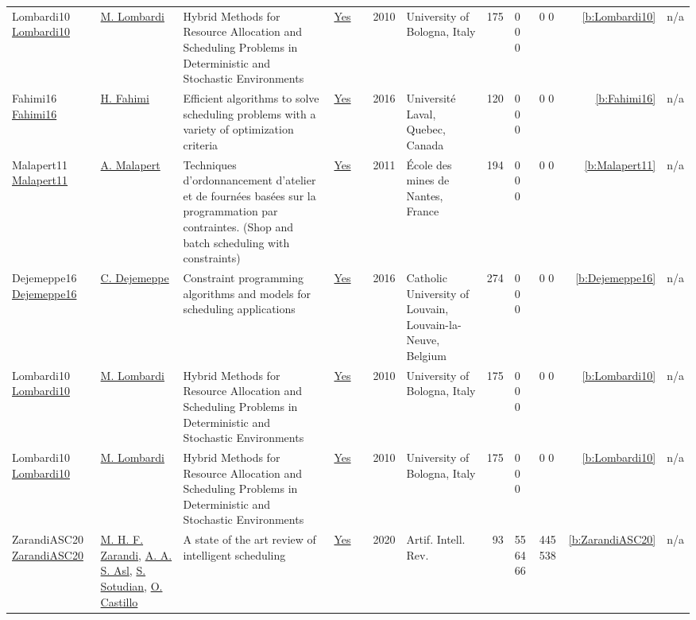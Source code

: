 {\begin{longtable}{>{\raggedright\arraybackslash}p{3cm}>{\raggedright\arraybackslash}p{4.5cm}>{\raggedright\arraybackslash}p{6.0cm}rrrp{2.5cm}rp{1cm}p{1cm}rr}
Lombardi10 \href{http://amsdottorato.unibo.it/2961/}{Lombardi10} & \hyperref[auth:a142]{M. Lombardi} & Hybrid Methods for Resource Allocation and Scheduling Problems in Deterministic and Stochastic Environments & \href{../works/Lombardi10.pdf}{Yes} & \cite{Lombardi10} & 2010 & University of Bologna, Italy & 175 & 0 0 0 & 0 0 & \ref{b:Lombardi10} & n/a\\
Fahimi16 \href{http://cp2014.a4cp.org/sites/default/files/hamed_fahimi_-_efficient_algorithms_to_solve_scheduling_problems_with_a_variety_of_optimization_criteria.pdf}{Fahimi16} & \hyperref[auth:a122]{H. Fahimi} & Efficient algorithms to solve scheduling problems with a variety of optimization criteria & \href{../works/Fahimi16.pdf}{Yes} & \cite{Fahimi16} & 2016 & Universit{\'{e}} Laval, Quebec, Canada & 120 & 0 0 0 & 0 0 & \ref{b:Fahimi16} & n/a\\
Malapert11 \href{https://tel.archives-ouvertes.fr/tel-00630122}{Malapert11} & \hyperref[auth:a82]{A. Malapert} & Techniques d'ordonnancement d'atelier et de fourn{\'{e}}es bas{\'{e}}es sur la programmation par contraintes. (Shop and batch scheduling with constraints) & \href{../works/Malapert11.pdf}{Yes} & \cite{Malapert11} & 2011 & {\'{E}}cole des mines de Nantes, France & 194 & 0 0 0 & 0 0 & \ref{b:Malapert11} & n/a\\
Dejemeppe16 \href{https://hdl.handle.net/2078.1/178078}{Dejemeppe16} & \hyperref[auth:a202]{C. Dejemeppe} & Constraint programming algorithms and models for scheduling applications & \href{../works/Dejemeppe16.pdf}{Yes} & \cite{Dejemeppe16} & 2016 & Catholic University of Louvain, Louvain-la-Neuve, Belgium & 274 & 0 0 0 & 0 0 & \ref{b:Dejemeppe16} & n/a\\
Lombardi10 \href{http://amsdottorato.unibo.it/2961/}{Lombardi10} & \hyperref[auth:a142]{M. Lombardi} & Hybrid Methods for Resource Allocation and Scheduling Problems in Deterministic and Stochastic Environments & \href{../works/Lombardi10.pdf}{Yes} & \cite{Lombardi10} & 2010 & University of Bologna, Italy & 175 & 0 0 0 & 0 0 & \ref{b:Lombardi10} & n/a\\
Lombardi10 \href{http://amsdottorato.unibo.it/2961/}{Lombardi10} & \hyperref[auth:a142]{M. Lombardi} & Hybrid Methods for Resource Allocation and Scheduling Problems in Deterministic and Stochastic Environments & \href{../works/Lombardi10.pdf}{Yes} & \cite{Lombardi10} & 2010 & University of Bologna, Italy & 175 & 0 0 0 & 0 0 & \ref{b:Lombardi10} & n/a\\
ZarandiASC20 \href{https://doi.org/10.1007/s10462-018-9667-6}{ZarandiASC20} & \hyperref[auth:a829]{M. H. F. Zarandi}, \hyperref[auth:a830]{A. A. S. Asl}, \hyperref[auth:a831]{S. Sotudian}, \hyperref[auth:a832]{O. Castillo} & A state of the art review of intelligent scheduling & \href{../works/ZarandiASC20.pdf}{Yes} & \cite{ZarandiASC20} & 2020 & Artif. Intell. Rev. & 93 & 55 64 66 & 445 538 & \ref{b:ZarandiASC20} & n/a\\
\end{longtable}
}

